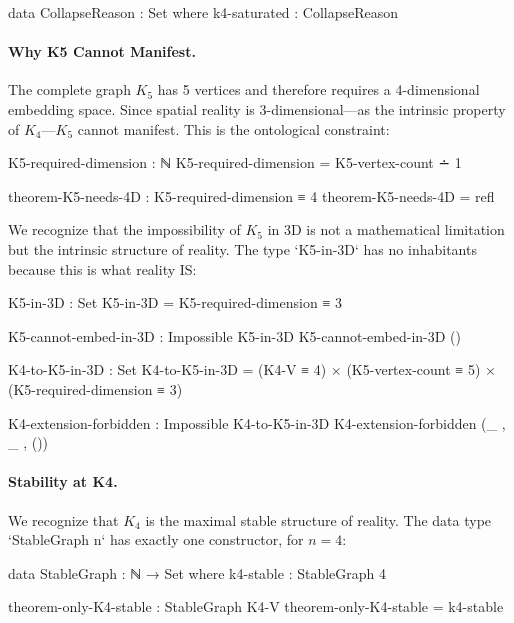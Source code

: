 \documentclass[11pt,a4paper]{book}
\begin{document}
\begin{code}
data CollapseReason : Set where
  k4-saturated : CollapseReason
\end{code}

\paragraph{Why K5 Cannot Manifest.}

The complete graph $K_5$ has 5 vertices and therefore requires a 4-dimensional embedding 
space. Since spatial reality is 3-dimensional—as the intrinsic property of $K_4$—$K_5$ cannot manifest. This is the ontological constraint:

\begin{code}
K5-required-dimension : ℕ
K5-required-dimension = K5-vertex-count ∸ 1

theorem-K5-needs-4D : K5-required-dimension ≡ 4
theorem-K5-needs-4D = refl
\end{code}

We recognize that the impossibility of $K_5$ in 3D is not a mathematical limitation but the intrinsic structure of reality. The type `K5-in-3D` has no inhabitants because this is what reality IS:

\begin{code}
K5-in-3D : Set
K5-in-3D = K5-required-dimension ≡ 3

K5-cannot-embed-in-3D : Impossible K5-in-3D
K5-cannot-embed-in-3D ()

K4-to-K5-in-3D : Set
K4-to-K5-in-3D = (K4-V ≡ 4) × (K5-vertex-count ≡ 5) × (K5-required-dimension ≡ 3)

K4-extension-forbidden : Impossible K4-to-K5-in-3D
K4-extension-forbidden (_ , _ , ())
\end{code}

\paragraph{Stability at K4.}

We recognize that $K_4$ is the maximal stable structure of reality. The data type 
`StableGraph n` has exactly one constructor, for $n = 4$:

\begin{code}
data StableGraph : ℕ → Set where
  k4-stable : StableGraph 4

theorem-only-K4-stable : StableGraph K4-V
theorem-only-K4-stable = k4-stable
\end{code}
\end{document}
